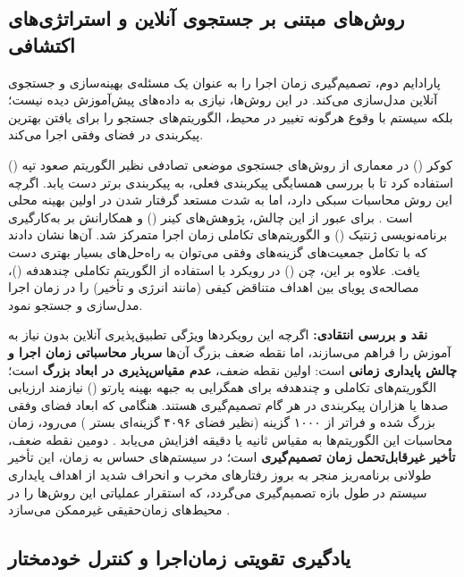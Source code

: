 \documentclass[oneside,openany,phd]{TMU-Thesis}
\begin{document}
\subsection{روش‌های مبتنی بر جستجوی آنلاین و استراتژی‌های اکتشافی}
\label{sec:ch3_search_based}

پارادایم دوم، تصمیم‌گیری زمان اجرا را به عنوان یک مسئله‌ی بهینه‌سازی و جستجوی آنلاین مدل‌سازی می‌کند. در این روش‌ها، نیازی به داده‌های پیش‌آموزش دیده نیست؛ بلکه سیستم با وقوع هرگونه تغییر در محیط، الگوریتم‌های جستجو را برای یافتن بهترین پیکربندی در فضای وفقی اجرا می‌کند.

کوکر () در معماری  \cite{coker2015sass} از روش‌های جستجوی موضعی تصادفی نظیر الگوریتم صعود تپه () استفاده کرد تا با بررسی همسایگی پیکربندی فعلی، به پیکربندی برتر دست یابد. اگرچه این روش محاسبات سبکی دارد، اما به شدت مستعد گرفتار شدن در اولین بهینه محلی است \cite{coker2015sass}. برای عبور از این چالش، پژوهش‌های کینر () و همکارانش \cite{kinneer2018managing, kinneer2020building, kinneer2021information} بر به‌کارگیری برنامه‌نویسی ژنتیک () و الگوریتم‌های تکاملی زمان اجرا متمرکز شد. آن‌ها نشان دادند که با تکامل جمعیت‌های گزینه‌های وفقی می‌توان به راه‌حل‌های بسیار بهتری دست یافت. علاوه بر این، چن () در رویکرد  \cite{chen2018femosaa} با استفاده از الگوریتم تکاملی چندهدفه ()، مصالحه‌ی پویای بین اهداف متناقض کیفی (مانند انرژی و تأخیر) را در زمان اجرا مدل‌سازی و جستجو نمود.

\textbf{نقد و بررسی انتقادی:}
اگرچه این رویکردها ویژگی تطبیق‌پذیری آنلاین بدون نیاز به آموزش را فراهم می‌سازند، اما نقطه ضعف بزرگ آن‌ها \textbf{سربار محاسباتی زمان اجرا و چالش پایداری زمانی} است:
اولین نقطه ضعف، \textbf{عدم مقیاس‌پذیری در ابعاد بزرگ} است؛ الگوریتم‌های تکاملی و چندهدفه برای همگرایی به جبهه بهینه پارتو () نیازمند ارزیابی صدها یا هزاران پیکربندی در هر گام تصمیم‌گیری هستند. هنگامی که ابعاد فضای وفقی بزرگ شده و فراتر از ۱۰۰۰ گزینه (نظیر فضای ۴۰۹۶ گزینه‌ای بستر ) می‌رود، زمان محاسبات این الگوریتم‌ها به مقیاس ثانیه یا دقیقه افزایش می‌یابد \cite{coker2015sass, kinneer2021information}. دومین نقطه ضعف، \textbf{تأخیر غیرقابل‌تحمل زمان تصمیم‌گیری} است؛ در سیستم‌های حساس به زمان، این تأخیر طولانی برنامه‌ریز منجر به بروز رفتارهای مخرب و انحراف شدید از اهداف پایداری سیستم در طول بازه تصمیم‌گیری می‌گردد، که استقرار عملیاتی این روش‌ها را در محیط‌های زمان‌حقیقی غیرممکن می‌سازد \cite{coker2015sass, kinneer2021information}.

\subsection{یادگیری تقویتی زمان‌اجرا و کنترل خودمختار}
\label{sec:ch3_rl_adaptation}
\end{document}
